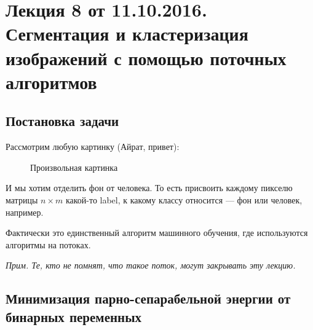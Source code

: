 \documentclass[a4paper, 12pt]{article}
\begin{document}
\pagestyle{fancy}

\section{Лекция 8 от 11.10.2016. Сегментация и кластеризация изображений
с помощью поточных алгоритмов}

\subsection{Постановка задачи}

Рассмотрим любую картинку (Айрат, привет):

\begin{figure}[H]
  \caption{Произвольная картинка}
\end{figure}

И мы хотим отделить фон от человека. То есть присвоить каждому пикселю матрицы
$n \times m$ какой-то label, к какому классу относится --- фон или человек,
например.

Фактически это единственный алгоритм машинного обучения, где используются
алгоритмы на потоках.

\textit{Прим. Те, кто не помнят, что такое поток, могут закрывать эту лекцию.}

\subsection{Минимизация парно-сепарабельной энергии от бинарных переменных}
\end{document}
